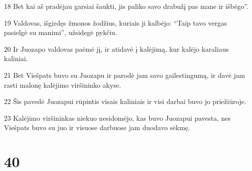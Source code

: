 \par 18 Bet kai aš pradėjau garsiai šaukti, jis paliko savo drabužį pas mane ir išbėgo”. 
\par 19 Valdovas, išgirdęs žmonos žodžius, kuriais ji kalbėjo: “Taip tavo vergas pasielgė su manimi”, užsidegė pykčiu. 
\par 20 Ir Juozapo valdovas paėmė jį, ir atidavė į kalėjimą, kur kalėjo karaliaus kaliniai. 
\par 21 Bet Viešpats buvo su Juozapu ir parodė jam savo gailestingumą, ir davė jam rasti malonę kalėjimo viršininko akyse. 
\par 22 Šis pavedė Juozapui rūpintis visais kaliniais ir visi darbai buvo jo priežiūroje. 
\par 23 Kalėjimo viršininkas niekuo nesidomėjo, kas buvo Juozapui pavesta, nes Viešpats buvo su juo ir visuose darbuose jam duodavo sėkmę.



\chapter{40}

